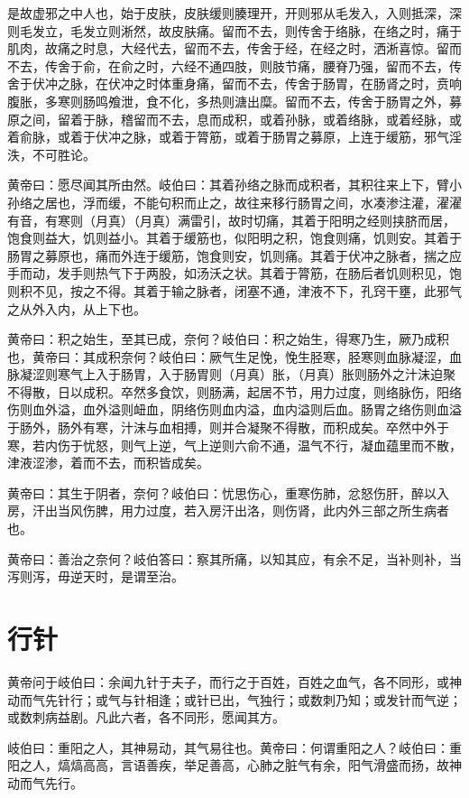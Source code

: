 \documentclass[12pt,UTF8]{ctexbook}
\begin{document}
	是故虚邪之中人也，始于皮肤，皮肤缓则腠理开，开则邪从毛发入，入则抵深，深则毛发立，毛发立则淅然，故皮肤痛。留而不去，则传舍于络脉，在络之时，痛于肌肉，故痛之时息，大经代去，留而不去，传舍于经，在经之时，洒淅喜惊。留而不去，传舍于俞，在俞之时，六经不通四肢，则肢节痛，腰脊乃强，留而不去，传舍于伏冲之脉，在伏冲之时体重身痛，留而不去，传舍于肠胃，在肠肾之时，贲响腹胀，多寒则肠鸣飧泄，食不化，多热则溏出糜。留而不去，传舍于肠胃之外，募原之间，留着于脉，稽留而不去，息而成积，或着孙脉，或着络脉，或着经脉，或着俞脉，或着于伏冲之脉，或着于膂筋，或着于肠胃之募原，上连于缓筋，邪气淫泆，不可胜论。
	
	黄帝曰：愿尽闻其所由然。岐伯曰：其着孙络之脉而成积者，其积往来上下，臂小孙络之居也，浮而缓，不能句积而止之，故往来移行肠胃之间，水凑渗注灌，濯濯有音，有寒则（月真）（月真）满雷引，故时切痛，其着于阳明之经则挟脐而居，饱食则益大，饥则益小。其着于缓筋也，似阳明之积，饱食则痛，饥则安。其着于肠胃之募原也，痛而外连于缓筋，饱食则安，饥则痛。其着于伏冲之脉者，揣之应手而动，发手则热气下于两股，如汤沃之状。其着于膂筋，在肠后者饥则积见，饱则积不见，按之不得。其着于输之脉者，闭塞不通，津液不下，孔窍干壅，此邪气之从外入内，从上下也。
	
	黄帝曰：积之始生，至其已成，奈何？岐伯曰：积之始生，得寒乃生，厥乃成积也，黄帝曰：其成积奈何？岐伯曰：厥气生足悗，悗生胫寒，胫寒则血脉凝涩，血脉凝涩则寒气上入于肠胃，入于肠胃则（月真）胀，（月真）胀则肠外之汁沫迫聚不得散，日以成积。卒然多食饮，则肠满，起居不节，用力过度，则络脉伤，阳络伤则血外溢，血外溢则衄血，阴络伤则血内溢，血内溢则后血。肠胃之络伤则血溢于肠外，肠外有寒，汁沫与血相搏，则并合凝聚不得散，而积成矣。卒然中外于寒，若内伤于忧怒，则气上逆，气上逆则六俞不通，温气不行，凝血蕴里而不散，津液涩渗，着而不去，而积皆成矣。
	
	黄帝曰：其生于阴者，奈何？岐伯曰：忧思伤心，重寒伤肺，忿怒伤肝，醉以入房，汗出当风伤脾，用力过度，若入房汗出洛，则伤肾，此内外三部之所生病者也。
	
	黄帝曰：善治之奈何？岐伯答曰：察其所痛，以知其应，有余不足，当补则补，当泻则泻，毋逆天时，是谓至治。
	
	\chapter{行针}
	
	黄帝问于岐伯曰：余闻九针于夫子，而行之于百姓，百姓之血气，各不同形，或神动而气先针行；或气与针相逢；或针已出，气独行；或数刺乃知；或发针而气逆；或数刺病益剧。凡此六者，各不同形，愿闻其方。
	
	岐伯曰：重阳之人，其神易动，其气易往也。黄帝曰：何谓重阳之人？岐伯曰：重阳之人，熇熇高高，言语善疾，举足善高，心肺之脏气有余，阳气滑盛而扬，故神动而气先行。
	
\end{document}
